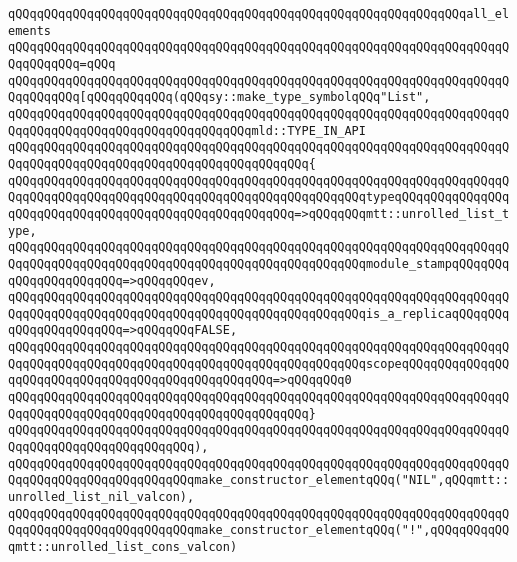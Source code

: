 \verb|qQQqqQQqqQQqqQQqqQQqqQQqqQQqqQQqqQQqqQQqqQQqqQQqqQQqqQQqqQQqqQQqall_elements|\newline
\verb|qQQqqQQqqQQqqQQqqQQqqQQqqQQqqQQqqQQqqQQqqQQqqQQqqQQqqQQqqQQqqQQqqQQqqQQqqQQqqQQq=qQQq|\newline
\verb|qQQqqQQqqQQqqQQqqQQqqQQqqQQqqQQqqQQqqQQqqQQqqQQqqQQqqQQqqQQqqQQqqQQqqQQqqQQqqQQq[qQQqqQQqqQQq(qQQqsy::make_type_symbolqQQq"List",|\newline
\newline
\verb|qQQqqQQqqQQqqQQqqQQqqQQqqQQqqQQqqQQqqQQqqQQqqQQqqQQqqQQqqQQqqQQqqQQqqQQqqQQqqQQqqQQqqQQqqQQqqQQqqQQqqQQqmld::TYPE_IN_API|\newline
\verb|qQQqqQQqqQQqqQQqqQQqqQQqqQQqqQQqqQQqqQQqqQQqqQQqqQQqqQQqqQQqqQQqqQQqqQQqqQQqqQQqqQQqqQQqqQQqqQQqqQQqqQQqqQQqqQQq{|\newline
\verb|qQQqqQQqqQQqqQQqqQQqqQQqqQQqqQQqqQQqqQQqqQQqqQQqqQQqqQQqqQQqqQQqqQQqqQQqqQQqqQQqqQQqqQQqqQQqqQQqqQQqqQQqqQQqqQQqqQQqqQQqtypeqQQqqQQqqQQqqQQqqQQqqQQqqQQqqQQqqQQqqQQqqQQqqQQqqQQqqQQq=>qQQqqQQqmtt::unrolled_list_type,|\newline
\verb|qQQqqQQqqQQqqQQqqQQqqQQqqQQqqQQqqQQqqQQqqQQqqQQqqQQqqQQqqQQqqQQqqQQqqQQqqQQqqQQqqQQqqQQqqQQqqQQqqQQqqQQqqQQqqQQqqQQqqQQqmodule_stampqQQqqQQqqQQqqQQqqQQqqQQq=>qQQqqQQqev,|\newline
\verb|qQQqqQQqqQQqqQQqqQQqqQQqqQQqqQQqqQQqqQQqqQQqqQQqqQQqqQQqqQQqqQQqqQQqqQQqqQQqqQQqqQQqqQQqqQQqqQQqqQQqqQQqqQQqqQQqqQQqqQQqis_a_replicaqQQqqQQqqQQqqQQqqQQqqQQq=>qQQqqQQqFALSE,|\newline
\verb|qQQqqQQqqQQqqQQqqQQqqQQqqQQqqQQqqQQqqQQqqQQqqQQqqQQqqQQqqQQqqQQqqQQqqQQqqQQqqQQqqQQqqQQqqQQqqQQqqQQqqQQqqQQqqQQqqQQqqQQqscopeqQQqqQQqqQQqqQQqqQQqqQQqqQQqqQQqqQQqqQQqqQQqqQQqqQQq=>qQQqqQQq0|\newline
\verb|qQQqqQQqqQQqqQQqqQQqqQQqqQQqqQQqqQQqqQQqqQQqqQQqqQQqqQQqqQQqqQQqqQQqqQQqqQQqqQQqqQQqqQQqqQQqqQQqqQQqqQQqqQQqqQQq}|\newline
\verb|qQQqqQQqqQQqqQQqqQQqqQQqqQQqqQQqqQQqqQQqqQQqqQQqqQQqqQQqqQQqqQQqqQQqqQQqqQQqqQQqqQQqqQQqqQQqqQQq),|\newline
\newline
\verb|qQQqqQQqqQQqqQQqqQQqqQQqqQQqqQQqqQQqqQQqqQQqqQQqqQQqqQQqqQQqqQQqqQQqqQQqqQQqqQQqqQQqqQQqqQQqqQQqmake_constructor_elementqQQq("NIL",qQQqmtt::unrolled_list_nil_valcon),|\newline
\verb|qQQqqQQqqQQqqQQqqQQqqQQqqQQqqQQqqQQqqQQqqQQqqQQqqQQqqQQqqQQqqQQqqQQqqQQqqQQqqQQqqQQqqQQqqQQqqQQqmake_constructor_elementqQQq("!",qQQqqQQqqQQqmtt::unrolled_list_cons_valcon)|\newline
